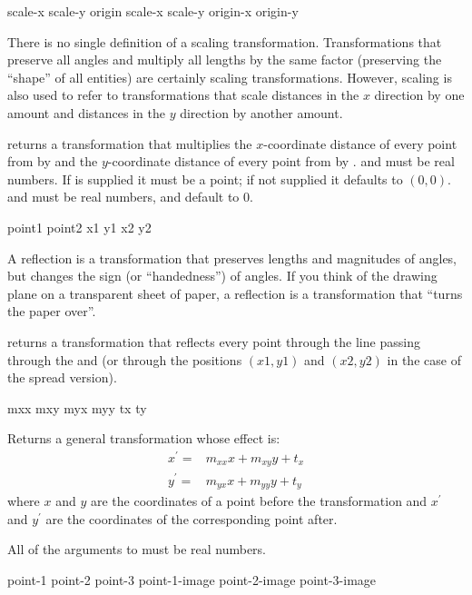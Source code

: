   {scale-x scale-y \optional origin} 
 {scale-x scale-y \optional origin-x origin-y} 

There is no single definition of a scaling transformation.  Transformations that
preserve all angles and multiply all lengths by the same factor (preserving the
``shape'' of all entities) are certainly scaling transformations.  However,
scaling is also used to refer to transformations that scale distances in the $x$
direction by one amount and distances in the $y$ direction by another amount.

 returns a transformation that multiplies the
$x$-coordinate distance of every point from  by  and
the $y$-coordinate distance of every point from  by .
 and  must be real numbers.  If  is
supplied it must be a point; if not supplied it defaults to $(0,0)$.
 and  must be real numbers, and default to $0$.


  {point1 point2}
 {x1 y1 x2 y2}

A reflection is a transformation that preserves lengths and magnitudes of
angles, but changes the sign (or ``handedness'') of angles.  If you think of the
drawing plane on a transparent sheet of paper, a reflection is a transformation
that ``turns the paper over''.

 returns a transformation that reflects every
point through the line passing through the   and
 (or through the positions $(x1,y1)$ and $(x2,y2)$ in the case of
the spread version).


 {mxx mxy myx myy tx ty}

Returns a general transformation whose effect is:
\begin{eqnarray*}
  x^\prime =& m_{xx} x + m_{xy} y + t_x \\
  y^\prime =& m_{yx} x + m_{yy} y + t_y
\end{eqnarray*}
where $x$ and $y$ are the coordinates of a point before the transformation and
$x^\prime$ and $y^\prime$ are the coordinates of the corresponding point after.

All of the arguments to  must be real numbers.


 {point-1 point-2 point-3 point-1-image point-2-image point-3-image}

